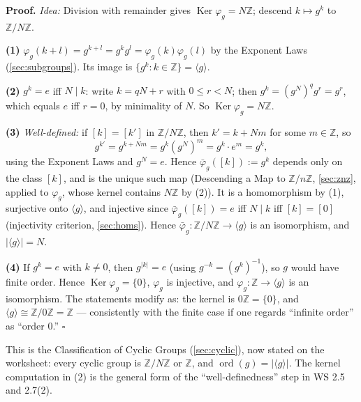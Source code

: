 \documentclass[11pt]{report}
\renewenvironment{proof}[1][Proof]{\noindent\textbf{#1.} }{\hfill$\square$\par\vspace{5pt}}
\begin{document}
\begin{proof}
\textit{Idea:} Division with remainder gives $\operatorname{Ker}\varphi_g = N\mathbb{Z}$; descend $k \mapsto g^k$ to $\mathbb{Z}/N\mathbb{Z}$.\par
\textbf{(1)} $\varphi_g(k + l) = g^{k+l} = g^k g^l = \varphi_g(k)\varphi_g(l)$ by the Exponent Laws (\ref{sec:subgroups}). Its image is $\{g^k : k \in \mathbb{Z}\} = \langle g \rangle$.

\textbf{(2)} $g^k = e$ iff $N \mid k$: write $k = qN + r$ with $0 \leq r < N$; then $g^k = (g^N)^q g^r = g^r$, which equals $e$ iff $r = 0$, by minimality of $N$. So $\operatorname{Ker}\varphi_g = N\mathbb{Z}$.

\textbf{(3)} \emph{Well-defined:} if $[k] = [k']$ in $\mathbb{Z}/N\mathbb{Z}$, then $k' = k + Nm$ for some $m \in \mathbb{Z}$, so
\[ g^{k'} = g^{k + Nm} = g^k (g^N)^m = g^k \cdot e^m = g^k, \]
using the Exponent Laws and $g^N = e$. Hence $\bar\varphi_g([k]) := g^k$ depends only on the class $[k]$, and is the unique such map (Descending a Map to $\mathbb{Z}/n\mathbb{Z}$, \ref{sec:znz}, applied to $\varphi_g$, whose kernel contains $N\mathbb{Z}$ by (2)). It is a homomorphism by (1), surjective onto $\langle g \rangle$, and injective since $\bar\varphi_g([k]) = e$ iff $N \mid k$ iff $[k] = [0]$ (injectivity criterion, \ref{sec:homs}). Hence $\bar\varphi_g: \mathbb{Z}/N\mathbb{Z} \to \langle g \rangle$ is an isomorphism, and $|\langle g \rangle| = N$.

\textbf{(4)} If $g^k = e$ with $k \neq 0$, then $g^{|k|} = e$ (using $g^{-k} = (g^k)^{-1}$), so $g$ would have finite order. Hence $\operatorname{Ker}\varphi_g = \{0\}$, $\varphi_g$ is injective, and $\varphi_g: \mathbb{Z} \to \langle g \rangle$ is an isomorphism. The statements modify as: the kernel is $0\mathbb{Z} = \{0\}$, and $\langle g \rangle \cong \mathbb{Z}/0\mathbb{Z} = \mathbb{Z}$ --- consistently with the finite case if one regards ``infinite order'' as ``order $0$.''
\end{proof}

\begin{rembox}\label{rem:relation-classification-cyclic-groups}
This is the Classification of Cyclic Groups (\ref{sec:cyclic}), now stated on the worksheet: every cyclic group is $\mathbb{Z}/N\mathbb{Z}$ or $\mathbb{Z}$, and $\operatorname{ord}(g) = |\langle g \rangle|$. The kernel computation in (2) is the general form of the ``well-definedness'' step in WS 2.5 and 2.7(2).
\end{rembox}
\end{document}
